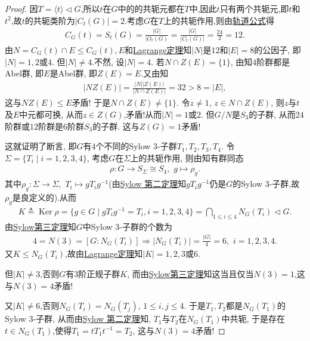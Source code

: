 \documentclass[../../main.tex]{subfiles}%
\begin{document}
\begin{proof}
因$T=\langle t \rangle\lhd G$,所以$t$在$G$中的的共轭元都在$T$中,因此$t$只有两个共轭元,即$t$和$t^2$,故$t$的共轭类阶为$|C_t(G)|=2$.考虑$G$在$T$上的共轭作用,则由\hyperref[corollary:有限群轨道的阶与其商掉迷向子群的阶相同]{轨道公式}得
\begin{align*}
C_G(t)=S_t(G)=\frac{|G|}{|O_t(G)}=\frac{|G|}{|C_t(G)|}=\frac{24}{2}=12.
\end{align*}
由$N=C_G(t)\cap E\leqslant C_G(t),E$和\hyperref[theorem:抽象代数--Lagrange定理]{Lagrange定理}知$|N|$是$12$和$|E|=8$的公因子, 即$|N|=1,2$或$4$. 但$|N| \neq 4$.不然, 设$|N|=4$. 若$N \cap Z(E)=\{1\}$, 由知$4$阶群都是Abel群, 即$E$是Abel群, 即$Z(E)=E$.又由知
\begin{align*}
|NZ(E)|=\frac{|N||Z(E)|}{|N\cap Z(E)|}=32> 8=|E|,
\end{align*}
这与$NZ(E)\leqslant E$矛盾! 于是$N \cap Z(E) \neq \{1\}$. 令$z \neq 1$, $z \in N \cap Z(E)$, 则$z$与$t$及$E$中元都可换, 从而$z \in Z(G)$,矛盾!从而$|N|=1$或$2$. 但$G/N$是$S_3$的子群, 从而$24$阶群或$12$阶群是$6$阶群$S_3$的子群. 这与$Z(G)=1$矛盾!

这就证明了断言, 即$G$有$4$个不同的Sylow 3-子群$T_1, T_2, T_3, T_4$. 令$\Sigma = \{T_i \mid i=1,2,3,4\}$, 考虑$G$在$\Sigma$上的共轭作用, 则由知有群同态
\begin{align*}
\rho: G \to S_\Sigma\cong S_4,\,\,g\mapsto \rho_g.
\end{align*}
其中$\rho_g:\Sigma\to \Sigma,\,\,T_i\mapsto gT_ig^{-1}$(由\hyperref[theorem:Sylow 第二定理]{Sylow 第二定理}知$gT_ig^{-1}$仍是$G$的Sylow 3-子群,故$\rho_g$是良定义的).从而
\begin{align*}
K\triangleq \operatorname{Ker} \rho = \{g \in G \mid gT_i g^{-1} = T_i, i=1,2,3,4\} 
= \bigcap\limits_{1 \leqslant i \leqslant 4} N_G(T_i) \lhd G.
\end{align*}
由\hyperref[theorem:Sylow第三定理]{Sylow第三定理}知$G$中Sylow 3-子群的个数为
\begin{align*}
4=N(3)=[G:N_G(T_i)]\Longrightarrow |N_G(T_i)|=\frac{|G|}{4}=6,\,\,i=1,2,3,4.
\end{align*}
又$K\leqslant N_G(T_i)$,故由\hyperref[theorem:抽象代数--Lagrange定理]{Lagrange定理}知$|K|=1,2,3$或$6$.

但$|K| \neq 3$,否则$G$有$3$阶正规子群$K$, 而由\hyperref[theorem:Sylow第三定理]{Sylow第三定理}知这当且仅当$N(3)=1$,这与$N(3)=4$矛盾!

又$|K| \neq 6$,否则$N_G(T_i)=N_G(T_j)$, $1 \leqslant i,j \leqslant 4$. 于是$T_1, T_2$都是$N_G(T_1)$的Sylow 3-子群, 从而由\hyperref[theorem:Sylow 第二定理]{Sylow 第二定理}知, $T_1$与$T_2$在$N_G(T_1)$中共轭, 于是存在$t\in N_G(T_1)$,使得$T_1=tT_1t^{-1}=T_2$, 这与$N(3)=4$矛盾!


\end{proof}
\end{document}
